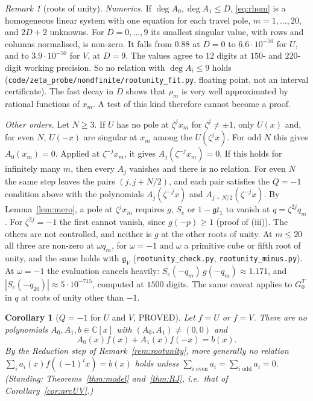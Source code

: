 \documentclass[11pt]{article}
\theoremstyle{plain}
\newtheorem{corollary}[theorem]{Corollary}
\theoremstyle{definition}
\theoremstyle{remark}
\newtheorem{remark}[theorem]{Remark}
\newcommand{\C}{\mathbb{C}}
\theoremstyle{plain}\newtheorem*{maintheorem}{Main Theorem}
\begin{document}
\begin{remark}[roots of unity]
\emph{Numerics.} If $\deg A_0,\deg A_1\le D$, \eqref{eq:rhom} is a homogeneous linear system with
one equation for each travel pole, $m=1,\dots,20$, and $2D+2$ unknowns. For
$D=0,\dots,9$ its smallest singular value, with rows and columns normalised, is non-zero. It
falls from $0.88$ at $D=0$ to $6.6\cdot10^{-50}$ for $U$, and to $3.9\cdot10^{-50}$ for $V$, at
$D=9$. The values agree to $12$ digits at $150$- and $220$-digit working precision. So no
relation with $\deg A_i\le9$ holds (\texttt{code/zeta\_probe/nondfinite/rootunity\_fit.py},
floating point, not an interval certificate). The fast decay in $D$ shows that $\rho_m$ is very
well approximated by rational functions of $x_m$. A test of this kind therefore cannot become a
proof.

\emph{Other orders.} Let $N\ge3$. If $U$ has no pole at $\zeta^jx_m$ for $\zeta^j\ne\pm1$, only
$U(x)$ and, for even $N$, $U(-x)$ are singular at $x_m$ among the $U(\zeta^jx)$. For odd $N$ this
gives $A_0(x_m)=0$. Applied at $\zeta^{-j}x_m$, it gives $A_j(\zeta^{-j}x_m)=0$. If this holds for
infinitely many $m$, then every $A_j$ vanishes and there is no relation. For even $N$ the same
step leaves the pairs $(j,j+N/2)$, and each pair satisfies the $Q=-1$ condition above with the
polynomials $A_j(\zeta^{-j}x)$ and $A_{j+N/2}(\zeta^{-j}x)$. By Lemma~\ref{lem:mero}, a pole at
$\zeta^jx_m$ requires $g$, $S_e$ or $1-\mathfrak gt_1$ to vanish at $q=\zeta^{2j}q_m$. For
$\zeta^{2j}=-1$ the first cannot vanish, since $g(-p)\ge1$ (proof of (iii)). The others are not
controlled, and neither is $g$ at the other roots of unity. At $m\le20$ all three are non-zero at
$\omega q_m$, for $\omega=-1$ and $\omega$ a primitive cube or fifth root of unity, and the same
holds with $\mathfrak g_V$ (\texttt{rootunity\_check.py}, \texttt{rootunity\_minus.py}). At
$\omega=-1$ the evaluation cancels heavily: $S_e(-q_m)\,g(-q_m)\approx1.171$, and
$|S_e(-q_{20})|\approx5\cdot10^{-715}$, computed at $1500$ digits. The same caveat applies to
$G^T_0$ in $q$ at roots of unity other than $-1$.
\end{remark}

\begin{corollary}[$Q=-1$ for $U$ and $V$, PROVED]\label{cor:Qminusone}
Let $f=U$ or $f=V$. There are no polynomials $A_0,A_1,b\in\C[x]$ with $(A_0,A_1)\ne(0,0)$ and
\[
   A_0(x)f(x)+A_1(x)f(-x)=b(x).
\]
By the Reduction step of Remark~\textup{\ref{rem:rootunity}}, more generally no relation
$\sum_ia_i(x)f((-1)^ix)=b(x)$ holds unless $\sum_{i\text{ even}}a_i=\sum_{i\text{ odd}}a_i=0$.
\textup{(}Standing: Theorems~\textup{\ref{thm:model}} and~\textup{\ref{thm:RJ}}, i.e.\ that of
Corollary~\textup{\ref{cor:arcUV}}.\textup{)}
\end{corollary}
\end{document}
